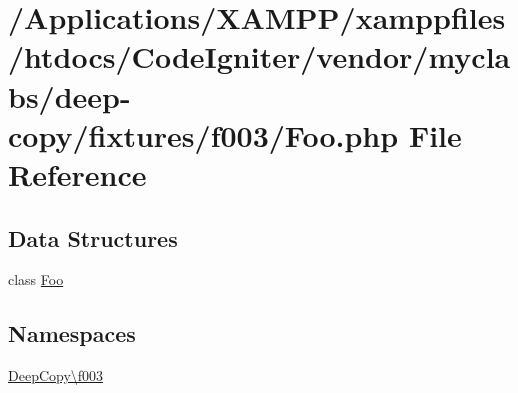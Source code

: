 \hypertarget{myclabs_2deep-copy_2fixtures_2f003_2_foo_8php}{}\section{/\+Applications/\+X\+A\+M\+P\+P/xamppfiles/htdocs/\+Code\+Igniter/vendor/myclabs/deep-\/copy/fixtures/f003/\+Foo.php File Reference}
\label{myclabs_2deep-copy_2fixtures_2f003_2_foo_8php}
\subsection*{Data Structures}
\begin{DoxyCompactItemize}
\item 
class \mbox{\hyperlink{class_deep_copy_1_1f003_1_1_foo}{Foo}}
\end{DoxyCompactItemize}
\subsection*{Namespaces}
\begin{DoxyCompactItemize}
\item 
 \mbox{\hyperlink{namespace_deep_copy_1_1f003}{Deep\+Copy\textbackslash{}f003}}
\end{DoxyCompactItemize}

